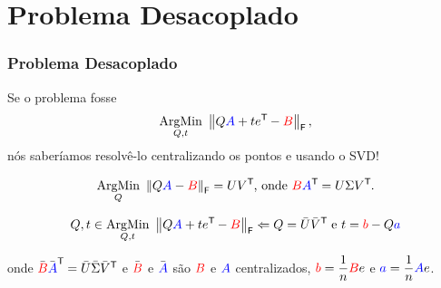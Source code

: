 
\section{Problema Desacoplado}

\begin{frame}[fragile]
  \frametitle{Problema Desacoplado}

  \begin{center}
    Se o problema fosse \[\argmin{Q,t} \fnorm{Q\blue{A} + t e\t - \red{B}},\] nós saberíamos resolvê-lo centralizando os pontos e usando o SVD!


  \[\argmin{Q} \fnorm{Q\blue{A} - \red{B}} = U V\t\text{, onde } \red{B} \blue{A}\t = U \E V\t.\]


  \[Q , t \in \argmin{Q,t} \fnorm{Q\blue{A} + t e\t - \red{B}} \Leftarrow Q = \bar{U} \bar{V}\t \text{ e } t = \red{b} - Q\blue{a}\]

  onde $\bar{\red{B}} \bar{\blue{A}}\t = \bar{U} \bar{\E} \bar{V}\t$ e $\bar{\red{B}}$ e $\bar{\blue{A}}$ são $\red{B}$ e $\blue{A}$ centralizados, $\red{b} = \dfrac{1}{n} \red{B} e$ e $\blue{a} = \dfrac{1}{n} \blue{A} e$.
  \end{center}
\end{frame}




